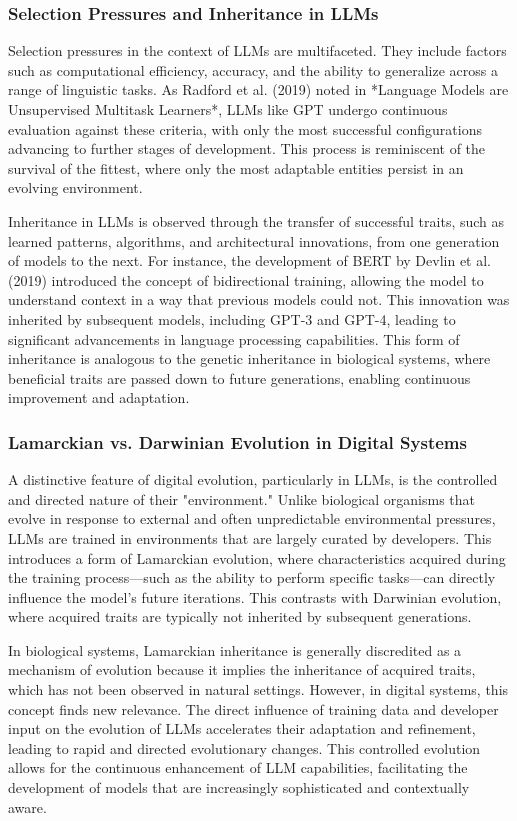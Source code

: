 \documentclass[12pt,twoside]{article}
\begin{document}
\subsubsection{Selection Pressures and Inheritance in LLMs}

Selection pressures in the context of LLMs are multifaceted. They include factors such as computational efficiency, accuracy, and the ability to generalize across a range of linguistic tasks. As Radford et al. (2019) noted in *Language Models are Unsupervised Multitask Learners*, LLMs like GPT undergo continuous evaluation against these criteria, with only the most successful configurations advancing to further stages of development. This process is reminiscent of the survival of the fittest, where only the most adaptable entities persist in an evolving environment.

Inheritance in LLMs is observed through the transfer of successful traits, such as learned patterns, algorithms, and architectural innovations, from one generation of models to the next. For instance, the development of BERT by Devlin et al. (2019) introduced the concept of bidirectional training, allowing the model to understand context in a way that previous models could not. This innovation was inherited by subsequent models, including GPT-3 and GPT-4, leading to significant advancements in language processing capabilities. This form of inheritance is analogous to the genetic inheritance in biological systems, where beneficial traits are passed down to future generations, enabling continuous improvement and adaptation.

\subsubsection{Lamarckian vs. Darwinian Evolution in Digital Systems}

A distinctive feature of digital evolution, particularly in LLMs, is the controlled and directed nature of their "environment." Unlike biological organisms that evolve in response to external and often unpredictable environmental pressures, LLMs are trained in environments that are largely curated by developers. This introduces a form of Lamarckian evolution, where characteristics acquired during the training process—such as the ability to perform specific tasks—can directly influence the model's future iterations. This contrasts with Darwinian evolution, where acquired traits are typically not inherited by subsequent generations.

In biological systems, Lamarckian inheritance is generally discredited as a mechanism of evolution because it implies the inheritance of acquired traits, which has not been observed in natural settings. However, in digital systems, this concept finds new relevance. The direct influence of training data and developer input on the evolution of LLMs accelerates their adaptation and refinement, leading to rapid and directed evolutionary changes. This controlled evolution allows for the continuous enhancement of LLM capabilities, facilitating the development of models that are increasingly sophisticated and contextually aware.
\end{document}
